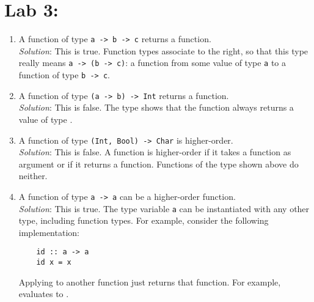 \section{Lab 3: \practicalThreeTitle}

\taskLine

	
\begin{enumerate}
	\item A function of type \texttt{\small a -> b -> c} returns a function. \\
	\emph{Solution}: This is true. Function types associate to the right, so that this type really means \texttt{\small a -> (b -> c)}: a function from some value of type \texttt{\small a} to a function of type \texttt{\small b -> c}.
	\item A function of type \texttt{\small (a -> b) -> Int} returns a function. \\
	\emph{Solution}: This is false. The type shows that the function always returns a value of type .
	\item A function of type \texttt{\small (Int, Bool) -> Char} is higher-order. \\
	\emph{Solution}: This is false. A function is higher-order if it takes a function as argument or if it returns a function. Functions of the type shown above do neither.
	\item A function of type \texttt{\small a -> a} can be a higher-order function.\\
	\emph{Solution}: This is true. The type variable \texttt{\small a} can be instantiated with any other type, including function types. For example, consider the following implementation:
	\begin{verbatim}
	id :: a -> a
	id x = x
	\end{verbatim}
	Applying  to another function just returns that function. For example,  evaluates to .
\end{enumerate}

\taskLine

	
